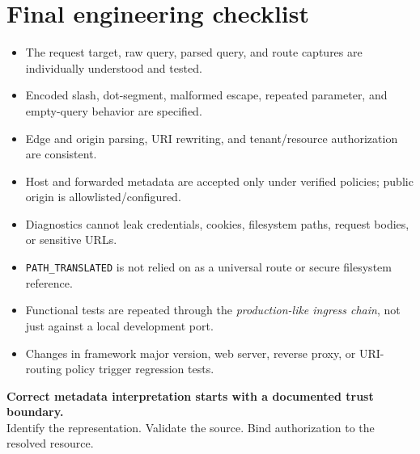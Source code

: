 \documentclass[10pt,letterpaper,oneside]{article}
\newcommand{\code}[1]{\texttt{#1}}
\begin{document}
\section*{Final engineering checklist}
\begin{keybox}
\begin{itemize}[label=$\square$,leftmargin=2em,itemsep=6pt]
\item The request target, raw query, parsed query, and route captures are individually understood and tested.
\item Encoded slash, dot-segment, malformed escape, repeated parameter, and empty-query behavior are specified.
\item Edge and origin parsing, URI rewriting, and tenant/resource authorization are consistent.
\item Host and forwarded metadata are accepted only under verified policies; public origin is allowlisted/configured.
\item Diagnostics cannot leak credentials, cookies, filesystem paths, request bodies, or sensitive URLs.
\item \code{PATH\_TRANSLATED} is not relied on as a universal route or secure filesystem reference.
\item Functional tests are repeated through the \emph{production-like ingress chain}, not just against a local development port.
\item Changes in framework major version, web server, reverse proxy, or URI-routing policy trigger regression tests.
\end{itemize}
\end{keybox}
\vspace{0.28in}
\begin{center}
{\large\bfseries\color{navy}Correct metadata interpretation starts with a documented trust boundary.}\\[7pt]
{\color{graytext}Identify the representation. Validate the source. Bind authorization to the resolved resource.}
\end{center}
\end{document}
